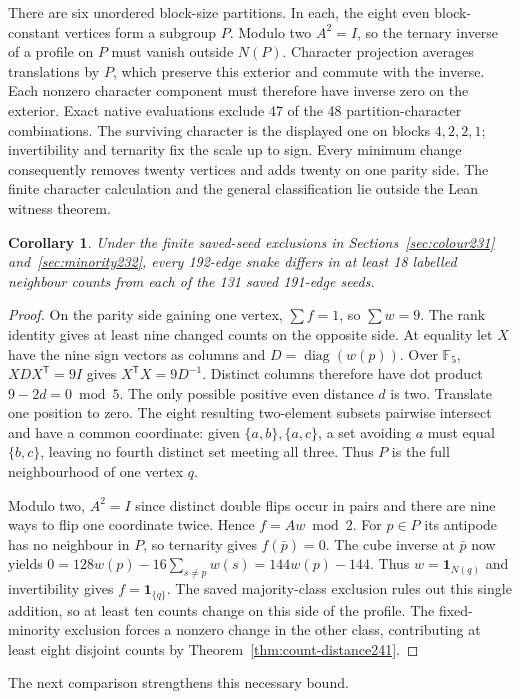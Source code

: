 \documentclass[11pt,a4paper]{article}
\newtheorem{corollary}[theorem]{Corollary}
\theoremstyle{definition}
\theoremstyle{remark}
\begin{document}
There are six unordered block-size partitions. In each, the eight even
block-constant vertices form a subgroup $P$. Modulo two $A^2=I$, so
the ternary inverse of a profile on $P$ must vanish outside $N(P)$.
Character projection averages translations by $P$, which preserve this
exterior and commute with the inverse. Each nonzero character component
must therefore have inverse zero on the exterior. Exact native evaluations
exclude 47 of the 48 partition-character combinations. The surviving
character is the displayed one on blocks $4,2,2,1$; invertibility and
ternarity fix the scale up to sign. Every minimum change consequently
removes twenty vertices and adds twenty on one parity side. The finite
character calculation and the general classification lie outside the
Lean witness theorem.

\begin{corollary}
Under the finite saved-seed exclusions in
Sections~\ref{sec:colour231} and~\ref{sec:minority232}, every
192-edge snake differs in at least 18 labelled neighbour counts
from each of the 131 saved 191-edge seeds.
\end{corollary}
\begin{proof}
On the parity side gaining one vertex, $\sum f=1$, so $\sum w=9$.
The rank identity gives at least nine changed counts on the opposite
side. At equality let $X$ have the nine sign vectors as columns and
$D=\operatorname{diag}(w(p))$. Over $\mathbb F_5$,
$XDX^{\mathsf T}=9I$ gives $X^{\mathsf T}X=9D^{-1}$.
Distinct columns therefore have dot product $9-2d=0\bmod5$.
The only possible positive even distance $d$ is two. Translate one
position to zero. The eight resulting two-element subsets pairwise
intersect and have a common coordinate: given $\{a,b\},\{a,c\}$,
a set avoiding $a$ must equal $\{b,c\}$, leaving no fourth distinct
set meeting all three. Thus $P$ is the full neighbourhood of one vertex $q$.

Modulo two, $A^2=I$ since distinct double flips occur in pairs and
there are nine ways to flip one coordinate twice. Hence $f=Aw\bmod2$.
For $p\in P$ its antipode has no neighbour in $P$, so ternarity gives
$f(\bar p)=0$. The cube inverse at $\bar p$ now yields
$0=128w(p)-16\sum_{s\ne p}w(s)=144w(p)-144$.
Thus $w=\mathbf1_{N(q)}$ and invertibility gives $f=\mathbf1_{\{q\}}$.
The saved majority-class exclusion rules out this single addition,
so at least ten counts change on this side of the profile.
The fixed-minority exclusion forces a nonzero change in the other
class, contributing at least eight disjoint counts by
Theorem~\ref{thm:count-distance241}.
\end{proof}
The next comparison strengthens this necessary bound.
\end{document}
